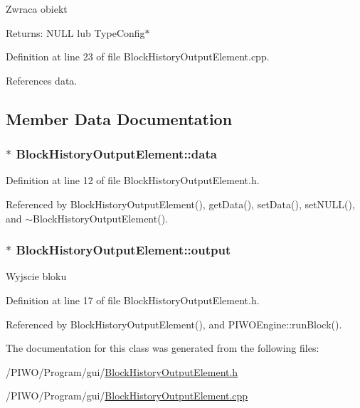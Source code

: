 Zwraca obiekt \begin{Desc}
\item[Returns:]NULL lub TypeConfig$\ast$ \end{Desc}


Definition at line 23 of file BlockHistoryOutputElement.cpp.

References data.

\subsection{Member Data Documentation}
\hypertarget{classBlockHistoryOutputElement_fcac98db485905d1cd9db29212c769a3}{
\subsubsection[data]{$\ast$ {\bf BlockHistoryOutputElement::data}}}
\label{classBlockHistoryOutputElement_fcac98db485905d1cd9db29212c769a3}




Definition at line 12 of file BlockHistoryOutputElement.h.

Referenced by BlockHistoryOutputElement(), getData(), setData(), setNULL(), and $\sim$BlockHistoryOutputElement().\hypertarget{classBlockHistoryOutputElement_3bd188f07c6e29c45ebd043c9a8bd755}{
\subsubsection[output]{$\ast$ {\bf BlockHistoryOutputElement::output}}}
\label{classBlockHistoryOutputElement_3bd188f07c6e29c45ebd043c9a8bd755}


Wyjscie bloku 

Definition at line 17 of file BlockHistoryOutputElement.h.

Referenced by BlockHistoryOutputElement(), and PIWOEngine::runBlock().

The documentation for this class was generated from the following files:\begin{CompactItemize}
\item 
/PIWO/Program/gui/\hyperlink{BlockHistoryOutputElement_8h}{BlockHistoryOutputElement.h}\item 
/PIWO/Program/gui/\hyperlink{BlockHistoryOutputElement_8cpp}{BlockHistoryOutputElement.cpp}\end{CompactItemize}
